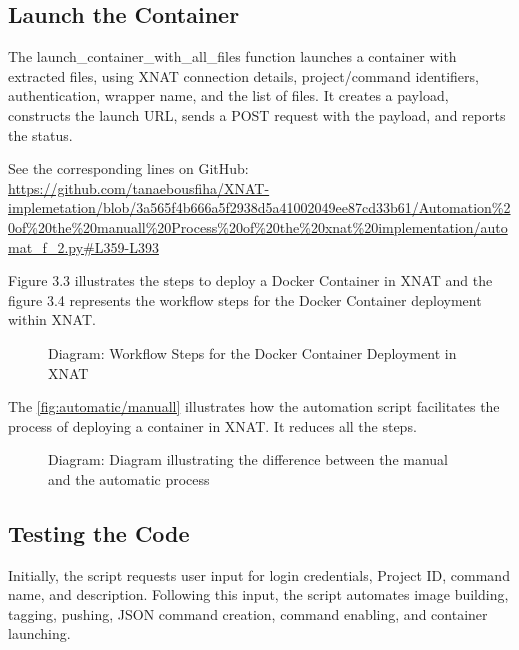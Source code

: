 \subsection{Launch the Container}

The launch\_container\_with\_all\_files function launches a container with extracted files, using XNAT connection details, project/command identifiers, authentication, wrapper name, and the list of files. It creates a payload, constructs the launch URL, sends a POST request with the payload, and reports the status.




\noindent\footnotesize See the corresponding lines on GitHub:\url{ https://github.com/tanaebousfiha/XNAT-implemetation/blob/3a565f4b666a5f2938d5a41002049ee87cd33b61/Automation%20of%20the%20manuall%20Process%20of%20the%20xnat%20implementation/automat_f_2.py#L359-L393}
\normalsize



Figure 3.3 illustrates the steps to deploy a Docker Container in XNAT and the figure 3.4 represents the workflow steps for the Docker Container deployment within XNAT.


\begin{figure}[ht]
    \centering
    \def\svgwidth{0.9\linewidth}
    
    \caption{Diagram: Workflow Steps for the Docker Container Deployment in XNAT}
    \label{fig:workflow-steps}
\end{figure}


The \autoref{fig:automatic/manuall} illustrates how the automation script facilitates the process of deploying a container in XNAT. It reduces all the steps.

\begin{figure}[ht]
    \centering
    \def\svgwidth{0.9\linewidth}
    
    \caption{Diagram: Diagram illustrating the difference between the manual and the automatic process}
    \label{fig:automatic/manuall}
\end{figure}



\subsection{Testing the Code}
Initially, the script requests user input for login credentials, Project ID, command name, and description. Following this input, the script automates image building, tagging, pushing, JSON command creation, command enabling, and container launching.


